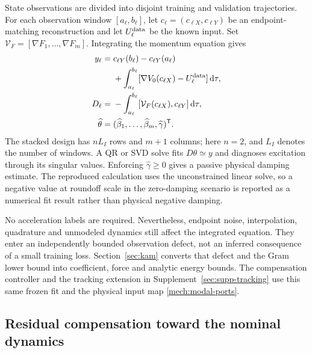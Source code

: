 State observations are divided into disjoint training and validation trajectories. For each observation window $[a_\ell,b_\ell]$, let $c_\ell=(c_{\ell X},c_{\ell Y})$ be an endpoint-matching reconstruction and let $U_\ell^{\rm data}$ be the known input. Set $\mathcal V_F=[\nabla F_1,\ldots,\nabla F_m]$. Integrating the momentum equation gives
\begin{equation}\label{struct:integral-design}
\begin{aligned}
 y_\ell={}&c_{\ell Y}(b_\ell)-c_{\ell Y}(a_\ell)\\
   &+\int_{a_\ell}^{b_\ell}
      [\nabla V_0(c_{\ell X})-U_\ell^{\rm data}]\,\mathrm d\tau,\\
 D_\ell={}&-\int_{a_\ell}^{b_\ell}
          [\mathcal V_F(c_{\ell X}),c_{\ell Y}]\,\mathrm d\tau,\\
 \widehat\theta={}&(\widehat\beta_1,\ldots,\widehat\beta_m,
                      \widehat\gamma)^{\mathsf T}.
\end{aligned}
\end{equation}
The stacked design has $nL_I$ rows and $m+1$ columns; here $n=2$, and $L_I$ denotes the number of windows. A QR or SVD solve fits $D\theta\simeq y$ and diagnoses excitation through its singular values. Enforcing $\widehat\gamma\ge0$ gives a passive physical damping estimate. The reproduced calculation uses the unconstrained linear solve, so a negative value at roundoff scale in the zero-damping scenario is reported as a numerical fit result rather than physical negative damping.

No acceleration labels are required. Nevertheless, endpoint noise, interpolation, quadrature and unmodeled dynamics still affect the integrated equation. They enter an independently bounded observation defect, not an inferred consequence of a small training loss. Section~\ref{sec:kam} converts that defect and the Gram lower bound into coefficient, force and analytic energy bounds. The compensation controller and the tracking extension in Supplement~\ref{sec:supp-tracking} use this same frozen fit and the physical input map \eqref{mech:modal-ports}.

\subsection{Residual compensation toward the nominal dynamics}
\label{struct:route-a-section}


